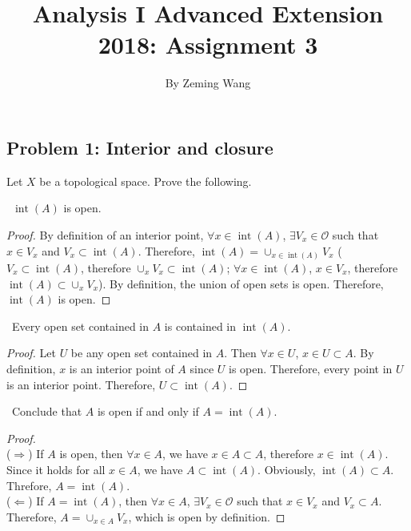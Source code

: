 \documentclass[12pt, a4paper]{amsart}
\title{Analysis I Advanced Extension 2018: Assignment 3}
\author{By Zeming Wang}
\newcommand{\turnin}{\faPencilSquareO}
\newcommand{\calO}{\mathcal{O}}
\renewcommand{\int}[1]{\operatorname{int}(#1)}
\begin{document}
\maketitle

\subsection*{Problem 1: Interior and closure}
Let $X$ be a topological space. Prove the following.
\begin{compactenum}[(a)]
  \setlength{\itemsep}{0.5em}
\item \turnin\ $\operatorname{int}(A)$ is open.

\begin{proof}
By definition of an interior point, $\forall x \in \int{A}$,
$\exists V_x \in \calO$ such that $x \in V_x$ and $V_x \subset \int{A}$.
Therefore, $\displaystyle \int{A} = \cup_{x\in\int{A}} V_x$
($V_x \subset \int{A}$, therefore $\cup_x V_x \subset \int{A}$;
$\forall x\in \int{A}$, $x \in V_x$, therefore $\int{A} \subset \cup_x V_x$).
By definition, the union of open sets is open. Therefore, $\int{A}$ is open.
\end{proof}

\item \turnin\ Every open set contained in $A$ is contained in $\operatorname{int}(A)$.

\begin{proof}
Let $U$ be any open set contained in $A$. Then $\forall x \in U$, $x \in U \subset A$.
By definition, $x$ is an interior point of $A$ since $U$ is open.
Therefore, every point in $U$ is an interior point.
Therefore, $U \subset \int{A}$.
\end{proof}

\item \turnin\ Conclude that $A$ is open if and only if $A = \operatorname{int}(A)$.

\begin{proof} $ $\\
\noindent
($\Rightarrow$) If $A$ is open, then $\forall x \in A$, we have $x \in A \subset A$, therefore $x\in\int{A}$.
Since it holds for all $x \in A$, we have $A \subset \int{A}$. Obviously, $\int{A} \subset A$.
Threfore, $A = \int{A}$.\\
\noindent
($\Leftarrow$) If $A = \int{A}$, then $\forall x \in A$,
$\exists V_x \in \calO$ such that $x\in V_x$ and $V_x \subset A$.
Therefore, $A = \cup_{x \in A} V_x$, which is open by definition.
\end{proof}

\end{compactenum}
\vspace{1em}
\end{document}
